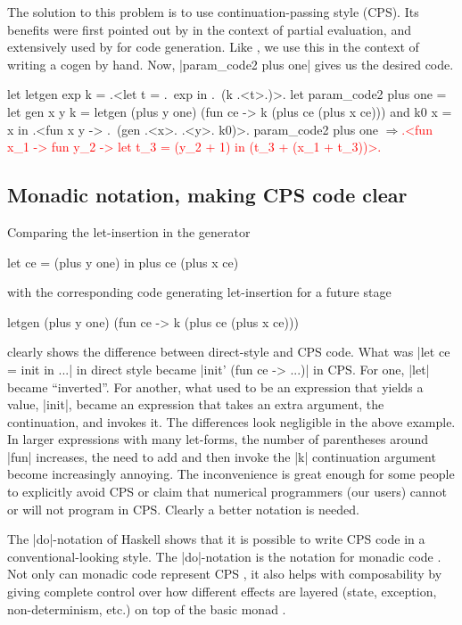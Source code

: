 \documentclass{elsart}
\newcommand{\evalresult}[1]{\ensuremath{\Longrightarrow}\textcolor{red}{#1}}
\begin{document}
The solution to this problem is to use continuation-passing style (CPS). Its
benefits were first pointed out by \cite{Bondorf:92} in the context of partial
evaluation, and extensively used by \cite{SwadiMonadic06,KiselyovTaha} for
code generation. Like \cite{conf/pepm/BondorfD94}, we use this in the 
context of writing a cogen by hand.  Now, |param_code2 plus one| gives us the
desired code.

\begin{code}[commandchars=\\\{\}]
let letgen exp k = .<let t = .~exp in .~(k .<t>.)>.
let param_code2 plus one =
  let gen x y k = letgen (plus y one)
                         (fun ce -> k (plus ce (plus x ce)))
  and k0 x = x
  in .<fun x y -> .~(gen .<x>. .<y>. k0)>.
param_code2 plus one
\evalresult{.<fun x_1 -> fun y_2 -> let t_3 = (y_2 + 1) in (t_3 + (x_1 + t_3))>.}
\end{code}

\subsection{Monadic notation, making CPS code clear}\label{monadicnotation}

Comparing the let-insertion in the generator
\begin{code}
let ce = (plus y one) in  plus ce (plus x ce)
\end{code}
with the corresponding code generating let-insertion for a future
stage
\begin{code}
letgen (plus y one) (fun ce -> k (plus ce (plus x ce)))
\end{code}
clearly shows the difference between  direct-style and CPS code.
What was |let ce = init in ...| in direct style became
|init' (fun ce -> ...)| in CPS. For one, |let| became
``inverted''. For another, what used to be an expression that yields
a value, |init|, became an expression that takes an extra argument,
the continuation, and invokes it. The differences look negligible in
the above example. In larger expressions with many let-forms, the
number of parentheses around |fun| increases, the need to add and
then invoke the |k| continuation argument become increasingly annoying. The
inconvenience is great enough for some people to explicitly avoid CPS
or claim that numerical programmers (our users) cannot or will not
program in CPS. Clearly a better notation is needed.

The |do|-notation of Haskell \cite{Haskell98Report} shows that it is possible
to write CPS code in a conventional-looking style. The
|do|-notation is the notation for monadic code \cite{moggi-notions}.
Not only can monadic code represent CPS \cite{Filinski:Representing},
it also helps with composability by giving complete control over how
different effects are layered
(state, exception, non-determinism, etc.) on top of the
basic monad \cite{liang-interpreter}.
\end{document}
